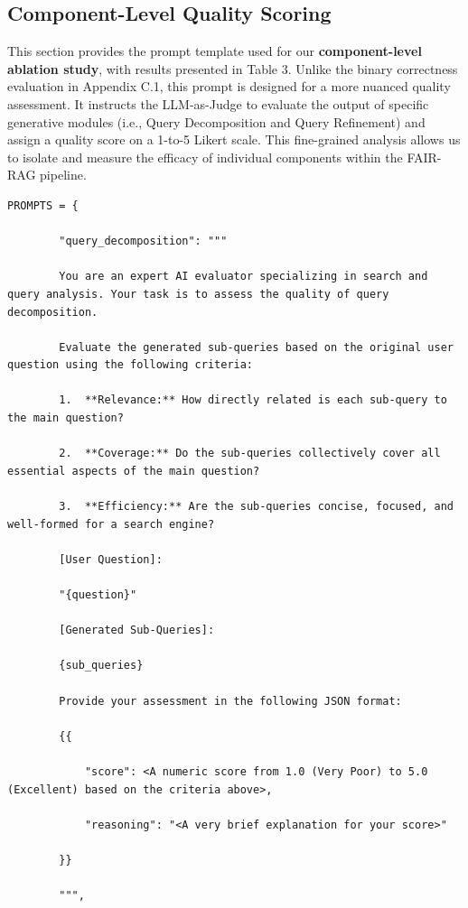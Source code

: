 \documentclass[11pt]{article}
\begin{document}
\subsection{Component-Level Quality Scoring}

This section provides the prompt template used for our \textbf{component-level ablation study}, with results presented in Table 3. Unlike the binary correctness evaluation in Appendix C.1, this prompt is designed for a more nuanced quality assessment. It instructs the LLM-as-Judge to evaluate the output of specific generative modules (i.e., Query Decomposition and Query Refinement) and assign a quality score on a 1-to-5 Likert scale. This fine-grained analysis allows us to isolate and measure the efficacy of individual components within the FAIR-RAG pipeline.

\begin{lstlisting}[basicstyle=\scriptsize\ttfamily]
PROMPTS = {

        "query_decomposition": """

        You are an expert AI evaluator specializing in search and query analysis. Your task is to assess the quality of query decomposition.

        Evaluate the generated sub-queries based on the original user question using the following criteria:

        1.  **Relevance:** How directly related is each sub-query to the main question?

        2.  **Coverage:** Do the sub-queries collectively cover all essential aspects of the main question?

        3.  **Efficiency:** Are the sub-queries concise, focused, and well-formed for a search engine?

        [User Question]:

        "{question}"

        [Generated Sub-Queries]:

        {sub_queries}

        Provide your assessment in the following JSON format:

        {{

            "score": <A numeric score from 1.0 (Very Poor) to 5.0 (Excellent) based on the criteria above>,

            "reasoning": "<A very brief explanation for your score>"

        }}

        """,


\end{lstlisting}
\end{document}
